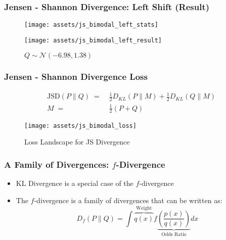 \documentclass{beamer}
\begin{document}
\begin{frame}
  \frametitle{Jensen - Shannon Divergence: Left Shift (Result)}
  \begin{figure}
    \centering
    \texttt{[image: assets/js\_bimodal\_left\_stats]}
  \end{figure}
  \begin{figure}
    \centering
    \texttt{[image: assets/js\_bimodal\_left\_result]}
    \caption{$Q \sim \mathcal{N}(-6.98, 1.38)$}
  \end{figure}
\end{frame}

\begin{frame}
  \frametitle{Jensen - Shannon Divergence Loss}
  \begin{equation*}
    \begin{aligned}
      \text{JSD}(P \parallel Q) \;=&\; \frac{1}{2} D_{KL}(P \parallel M) + \frac{1}{2} D_{KL}(Q \parallel M) \\
      M \;=&\; \frac{1}{2} (P + Q)
    \end{aligned}
  \end{equation*}
  \begin{figure}
    \centering
    \texttt{[image: assets/js\_bimodal\_loss]}
    \caption{Loss Landscape for JS Divergence}
  \end{figure}
\end{frame}


\begin{frame}
  \frametitle{A Family of Divergences: $f$-Divergence}
  \begin{itemize}
    \item KL Divergence is a special case of the $f$-divergence
    \item The $f$-divergence is a family of divergences that can be written as:
    \begin{equation*}
      D_{f}(P \parallel Q) = \int \overbrace{q(x)}^{\text{Weight}} f \underbrace{\left( \frac{p(x)}{q(x)} \right)}_{\text{Odds Ratio}} dx
    \end{equation*}
  \end{itemize}
\end{frame}
\end{document}
